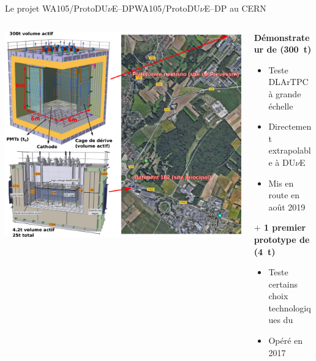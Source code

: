     \begin{frame}{Le projet WA105/ProtoDU$\nu$E--DP}{WA105/\texorpdfstring{ProtoDU$\nu$E}{ProtoDUNE}--DP au CERN}
        \begin{scriptsize}
            \begin{columns}
                \begin{column}{0.75\textwidth}
                    \centering
                    \includegraphics[width=\textwidth]{./pictures/wa105.png}
                \end{column}
                \begin{column}{0.25\textwidth}
                    \textbf{Démonstrateur de \SSS{} (\SI{300}{\tonne})}\\
                    \begin{itemize}
                        \item Teste DLArTPC à grande échelle
                        \item Directement extrapolable à DU$\nu$E
                        \item Mis en route en août 2019
                    \end{itemize}
                    \vspace{1cm}
                    \textbf{$+$ 1 premier prototype de \TOO{} (\SI{4}{\tonne})}\\
                    \begin{itemize}
                        \item Teste certains choix technologiques du \SSS{}
                        \item Opéré en 2017
                    \end{itemize}
                \end{column}
            \end{columns}
        \end{scriptsize}
    \end{frame}

